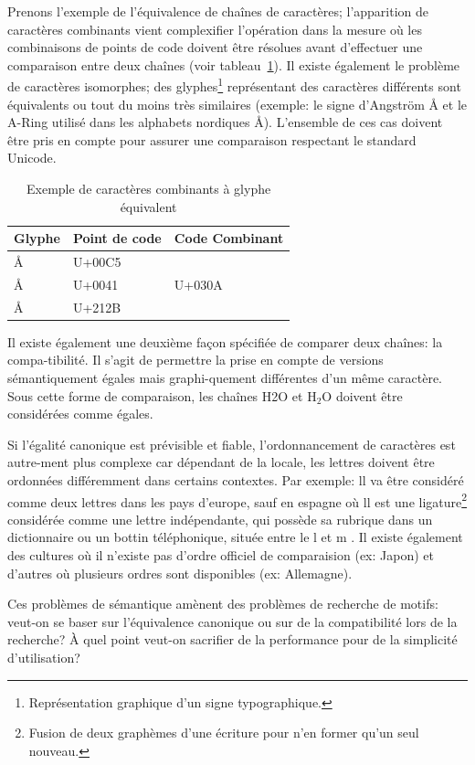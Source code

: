 Prenons l'exemple de l'équivalence de chaînes de caractères; l'apparition de caractères combinants
vient complexifier l'opération dans la mesure où les combinaisons de points de code doivent
être résolues avant d'effectuer une comparaison entre deux chaînes (voir tableau~\ref{combining_example}).
Il existe également le problème de caractères isomorphes; des
glyphes\footnote{Représentation graphique d'un signe typographique.} représentant des caractères différents
sont équivalents ou tout du moins très similaires (exemple: le signe d'Angström Å et le A-Ring utilisé
dans les alphabets nordiques Å).
L'ensemble de ces cas doivent être pris en compte pour assurer une comparaison respectant le standard
Unicode.

\begin{table}
	\caption{\label{combining_example}Exemple de caractères combinants à glyphe équivalent}
	\centering
	\begin{tabular}{lll}
		\hline
		Glyphe & Point de code & Code Combinant \\
		\hline
		Å & U+00C5 &   \\
		Å & U+0041 & U+030A \\
		Å & U+212B &  \\
		\hline
	\end{tabular}
\end{table}

Il existe également une deuxième façon spécifiée de comparer deux chaînes: la compa-tibilité.
Il s'agit de permettre la prise en compte de versions sémantiquement égales mais graphi-quement différentes
d'un même caractère.
Sous cette forme de comparaison, les chaînes \og H2O \fg{} et \og H$_{2}$O \fg{} doivent être considérées
comme égales.

Si l'égalité canonique est prévisible et fiable, l'ordonnancement de caractères est autre-ment plus complexe
car dépendant de la locale, les lettres doivent être ordonnées différemment dans certains contextes.
Par exemple: \og ll \fg{} va être considéré comme deux lettres dans les pays d'europe, sauf en espagne où
\og ll \fg{} est
une ligature\footnote{Fusion de deux graphèmes d’une écriture pour n’en former qu’un seul nouveau.} considérée
comme une lettre indépendante, qui possède sa rubrique dans un dictionnaire ou un bottin téléphonique,
située entre le \og l \fg{} et \og m \fg{}.
Il existe également des cultures où il n'existe pas d'ordre officiel de comparaision (ex: Japon) et d'autres
où plusieurs ordres sont disponibles (ex: Allemagne).

Ces problèmes de sémantique amènent des problèmes de recherche de motifs: veut-on se baser sur
l'équivalence canonique ou sur de la compatibilité lors de la recherche? À quel point veut-on sacrifier de
la performance pour de la simplicité d'utilisation?


